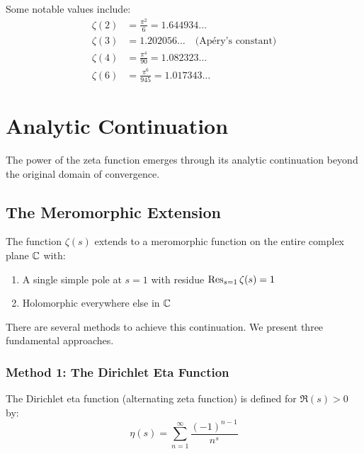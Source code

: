 \begin{example}
Some notable values include:
\begin{align}
\zeta(2) &= \frac{\pi^2}{6} = 1.644934\ldots \\
\zeta(3) &= 1.202056\ldots \quad \text{(Apéry's constant)} \\
\zeta(4) &= \frac{\pi^4}{90} = 1.082323\ldots \\
\zeta(6) &= \frac{\pi^6}{945} = 1.017343\ldots
\end{align}
\end{example}

\section{Analytic Continuation}
\label{sec:analytic_continuation}

The power of the zeta function emerges through its analytic continuation beyond the original domain of convergence.

\subsection{The Meromorphic Extension}

\begin{theorem}
\label{thm:riemann_continuation}
The function $\zeta(s)$ extends to a meromorphic function on the entire complex plane $\mathbb{C}$ with:
\begin{enumerate}[label=(\alph*)]
\item A single simple pole at $s = 1$ with residue $\operatorname{Res}_{s=1} \zeta(s) = 1$
\item Holomorphic everywhere else in $\mathbb{C}$
\end{enumerate}
\end{theorem}

There are several methods to achieve this continuation. We present three fundamental approaches.

\subsubsection{Method 1: The Dirichlet Eta Function}

\begin{definition}
\label{def:eta_function}
The Dirichlet eta function (alternating zeta function) is defined for $\Re(s) > 0$ by:
\begin{equation}
\eta(s) = \sum_{n=1}^{\infty} \frac{(-1)^{n-1}}{n^s}
\label{eq:eta_definition}
\end{equation}
\end{definition}

